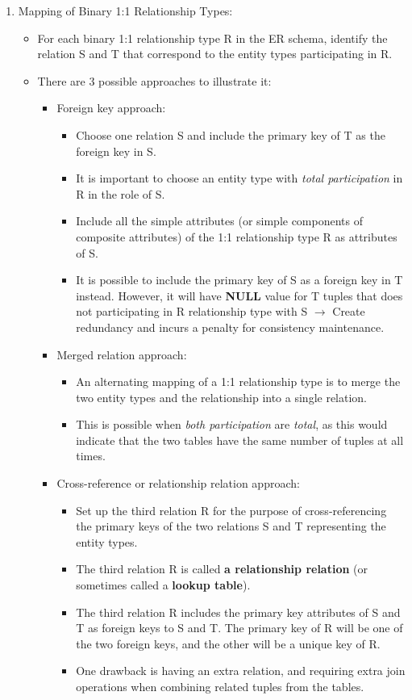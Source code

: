\documentclass[10pt]{article}
\newcommand{\tf}{\textbf}
\newcommand{\ti}{\textit}
\begin{document}
\begin{enumerate}
	\item Mapping of Binary 1:1 Relationship Types:
	\begin{itemize}
		\item For each binary 1:1 relationship type R in the ER schema, identify the relation S and T that correspond to the entity types participating in R.
		\item There are 3 possible approaches to illustrate it: 
		\begin{itemize}
			\item Foreign key approach:
			\begin{itemize}
				\item Choose one relation S and include the primary key of T as the foreign key in S.
				\item It is important to choose an entity type with \ti{total participation} in R in the role of S.
				\item Include all the simple attributes (or simple components of composite attributes) of the 1:1 relationship type R as attributes of S.
				\item It is possible to include the primary key of S as a foreign key in T instead. However, it will have \tf{NULL} value for T tuples that does not participating in R relationship type with S $\rightarrow$ Create redundancy and incurs a penalty for consistency maintenance. 
			\end{itemize}

			\item Merged relation approach:
			\begin{itemize}
				\item An alternating mapping of a 1:1 relationship type is to merge the two entity types and the relationship into a single relation.
				\item This is possible when \ti{both participation} are \ti{total}, as this would indicate that the two tables have the same number of tuples at all times. 
			\end{itemize}

			\item Cross-reference or relationship relation approach:
			\begin{itemize}
				\item Set up the third relation R for the purpose of cross-referencing the primary keys of the two relations S and T representing the entity types.
				\item The third relation R is called \tf{a relationship relation} (or sometimes called a \tf{lookup table}).
				\item The third relation R includes the primary key attributes of S and T as foreign keys to S and T. The primary key of R will be one of the two foreign keys, and the other will be a unique key of R.
				\item One drawback is having an extra relation, and requiring extra join operations when combining related tuples from the tables.
			\end{itemize}
		\end{itemize}
	\end{itemize}


\end{enumerate}
\end{document}
